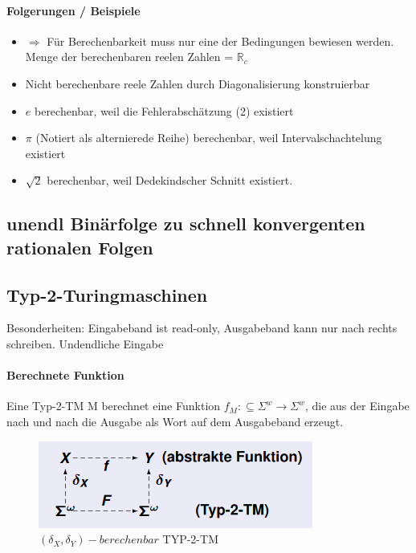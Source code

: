 \documentclass[ngerman]{scrartcl}
\begin{document}
 \paragraph{Folgerungen / Beispiele}
\begin{itemize}
  \item $ \Rightarrow $ Für Berechenbarkeit muss nur eine der Bedingungen bewiesen werden. Menge der berechenbaren reelen Zahlen = $ \mathbb{R}_c $
  \item Nicht berechenbare reele Zahlen durch Diagonalisierung konstruierbar
  \item $ e $ berechenbar, weil die Fehlerabschätzung (2) existiert
  \item $ \pi $ (Notiert als alternierede Reihe) berechenbar, weil Intervalschachtelung existiert
  \item $ \sqrt{2} $ berechenbar, weil Dedekindscher Schnitt existiert.
 \end{itemize}

\subsection{unendl Binärfolge zu schnell konvergenten rationalen Folgen}

\subsection{Typ-2-Turingmaschinen}
Besonderheiten: Eingabeband ist read-only, Ausgabeband kann nur nach rechts schreiben. Undendliche Eingabe

\paragraph{Berechnete Funktion}
Eine Typ-2-TM M berechnet eine Funktion $ f_M: \subseteq \Sigma^w \rightarrow \Sigma^w $, die aus der Eingabe nach und nach die Ausgabe als Wort auf dem Ausgabeband erzeugt.

\begin{figure}[h]
  \centering
  \includegraphics{typ2name.PNG}
  \caption{$ (\delta_X, \delta_Y)-berechenbar$ TYP-2-TM}
\end{figure}
\end{document}
